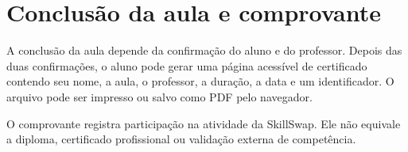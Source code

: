 \section{Conclusão da aula e comprovante}

A conclusão da aula depende da confirmação do aluno e do professor. Depois das duas confirmações, o aluno pode gerar uma página acessível de certificado contendo seu nome, a aula, o professor, a duração, a data e um identificador. O arquivo pode ser impresso ou salvo como PDF pelo navegador.

O comprovante registra participação na atividade da SkillSwap. Ele não equivale a diploma, certificado profissional ou validação externa de competência.

